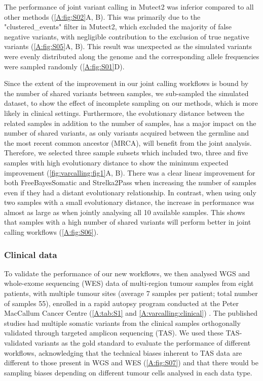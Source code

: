 The performance of joint variant calling in Mutect2 was inferior compared to all other methods (\autoref{A:fig:S02}A, B). This was primarily due to the "clustered\_events" filter in Mutect2, which excluded the majority of false negative variants, with negligible contribution to the exclusion of true negative variants (\autoref{A:fig:S05}A, B). This result was unexpected as the simulated variants were evenly distributed along the genome and the corresponding allele frequencies were sampled randomly (\autoref{A:fig:S01}D).

Since the extent of the improvement in our joint calling workflows is bound by the number of shared variants between samples, we sub-sampled the simulated dataset, to show the effect of incomplete sampling on our methods, which is more likely in clinical settings. Furthermore, the evolutionary distance between the related samples in addition to the number of samples, has a major impact on the number of shared variants, as only variants acquired between the germline and the most recent common ancestor (MRCA), will benefit from the joint analysis. Therefore, we selected three sample subsets which included two, three and five samples with high evolutionary distance to show the minimum expected improvement (\autoref{fig:varcalling:fig1}A, B). There was a clear linear improvement for both FreeBayesSomatic and Strelka2Pass when increasing the number of samples even if they had a distant evolutionary relationship. In contrast, when using only two samples with a small evolutionary distance, the increase in performance was almost as large as when jointly analysing all 10 available samples. This shows that samples with a high number of shared variants will perform better in joint calling workflows (\autoref{A:fig:S06}).

\subsubsection{Clinical data}
\label{variantcalling-sec:realdata}
To validate the performance of our new workflows, we then analysed WGS and whole-exome sequencing (WES) data of multi-region tumour samples from eight patients, with multiple tumour sites (average 7 samples per patient; total number of samples 55), enrolled in a rapid autopsy program conducted at the Peter MacCallum Cancer Centre (\autoref{A:tab:S1} and \autoref{A:varcalling:clinical}) \parencite{Solomon2020, Vergara2021}. The published studies had multiple somatic variants from the clinical samples orthogonally validated through targeted amplicon sequencing (TAS). We used these TAS-validated variants as the gold standard to evaluate the performance of different workflows, acknowledging that the technical biases inherent to TAS data are different to those present in WGS and WES (\autoref{A:fig:S07}) and that there would be sampling biases depending on different tumour cells analysed in each data type.

